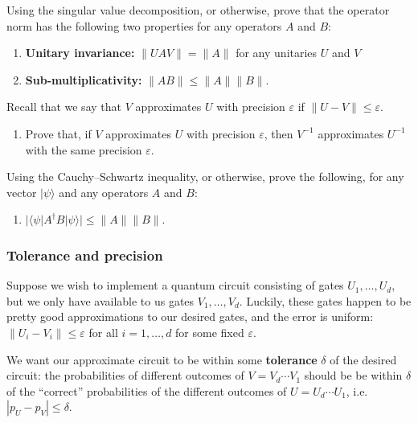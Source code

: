 \documentclass[fleqn,a4paper]{article}
\providecommand{\tightlist}{\setlength{\itemsep}{0pt}\setlength{\parskip}{0pt}}
\renewcommand{\footnote}[1]{\sidenotetext[{\color{white}0}\!\!]{\footnotesize #1}}
\theoremstyle{definition}
\theoremstyle{definition}
\theoremstyle{definition}
\theoremstyle{definition}
\theoremstyle{remark}
\begin{document}
Using the singular value decomposition\footnote{Recall Exercise \ref{the-schmidt-decomposition}}, or otherwise, prove that the operator norm has the following two properties for any operators \(A\) and \(B\):

\begin{enumerate}
\def\labelenumi{\arabic{enumi}.}
\setcounter{enumi}{4}
\tightlist
\item
  \textbf{Unitary invariance:} \(\|UAV\|=\|A\|\) for any unitaries \(U\) and \(V\)
\item
  \textbf{Sub-multiplicativity:} \(\|AB\|\leqslant\|A\|\|B\|\).
\end{enumerate}

Recall that we say that \(V\) approximates \(U\) with precision \(\varepsilon\) if \(\|U-V\|\leqslant\varepsilon\).

\begin{enumerate}
\def\labelenumi{\arabic{enumi}.}
\setcounter{enumi}{6}
\tightlist
\item
  Prove that, if \(V\) approximates \(U\) with precision \(\varepsilon\), then \(V^{-1}\) approximates \(U^{-1}\) with the same precision \(\varepsilon\).
\end{enumerate}

Using the Cauchy--Schwartz inequality, or otherwise, prove the following, for any vector \(|\psi\rangle\) and any operators \(A\) and \(B\):

\begin{enumerate}
\def\labelenumi{\arabic{enumi}.}
\setcounter{enumi}{7}
\tightlist
\item
  \(|\langle\psi|A^\dagger B|\psi\rangle|\leqslant\|A\|\|B\|\).
\end{enumerate}

\hypertarget{tolerance-and-precision}{%
\subsubsection{Tolerance and precision}\label{tolerance-and-precision}}

Suppose we wish to implement a quantum circuit consisting of gates \(U_1,\ldots,U_d\), but we only have available to us gates \(V_1,\ldots,V_d\).
Luckily, these gates happen to be pretty good approximations to our desired gates, and the error is uniform: \(\|U_i-V_i\|\leqslant\varepsilon\) for all \(i=1,\ldots,d\) for some fixed \(\varepsilon\).

We want our approximate circuit to be within some \textbf{tolerance} \(\delta\) of the desired circuit: the probabilities of different outcomes of \(V=V_d\cdots V_1\) should be be within \(\delta\) of the ``correct'' probabilities of the different outcomes of \(U=U_d\cdots U_1\), i.e.~\(|p_U-p_V|\leqslant\delta\).
\end{document}
